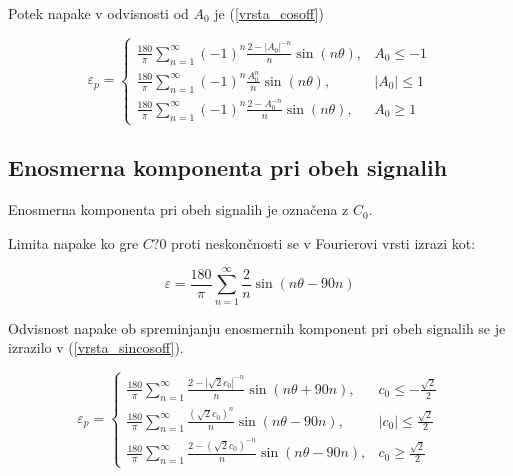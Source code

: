 Potek napake v odvisnosti od $A_0$ je (\ref{vrsta_cosoff})

\begin{equation}
\label{vrsta_cosoff}
\varepsilon_p=
\begin{cases}
\frac{180}{\pi}\sum_{n=1}^{\infty}(-1)^n\frac{2-|A_0|^{-n}}{n} \sin (n \theta ), & A_0\leq -1 \\
\frac{180}{\pi}\sum_{n=1}^{\infty}(-1)^n\frac{A_0^n}{n} \sin (n \theta ), & |A_0|\leq 1 \\
\frac{180}{\pi}\sum_{n=1}^{\infty}(-1)^n\frac{2-A_0^{-n}}{n} \sin (n \theta ), & A_0\geq 1
\end{cases}
\end{equation}


\newpage
\subsection{Enosmerna komponenta pri obeh signalih}
\label{2_offseta}
Enosmerna komponenta pri obeh signalih je označena z $C_0$.

Limita napake ko gre $C?0$ proti neskončnosti se v Fourierovi vrsti izrazi kot:




\begin{equation}
\varepsilon = \frac{180}{\pi}\sum_{n=1}^{\infty}\frac{2}{n} \sin (n \theta- 90 n)
\end{equation}


Odvisnost napake ob spreminjanju enosmernih komponent pri obeh signalih se je izrazilo v (\ref{vrsta_sincosoff}).


\begin{equation}
\label{vrsta_sincosoff}
\varepsilon_p=
\begin{cases}
\frac{180}{\pi}\sum_{n=1}^{\infty}\frac{2-|\sqrt{2}c_0|^{-n}}{n} \sin (n \theta + 90 n), & c_0\leq -\frac{\sqrt{2}}{2} \\
\frac{180}{\pi}\sum_{n=1}^{\infty}\frac{(\sqrt{2}c_0)^n}{n} \sin (n \theta - 90 n), & |c_0|\leq \frac{\sqrt{2}}{2} \\
\frac{180}{\pi}\sum_{n=1}^{\infty}\frac{2-(\sqrt{2}c_0)^{-n}}{n} \sin (n \theta - 90 n), & c_0\geq \frac{\sqrt{2}}{2}
\end{cases}
\end{equation}

